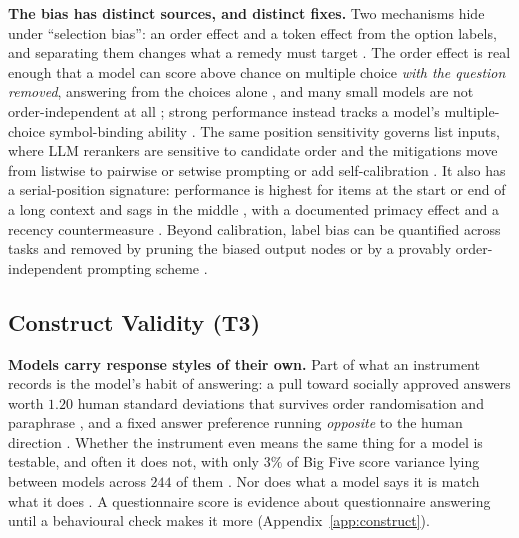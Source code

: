 \documentclass[11pt]{article}
\begin{document}
\textbf{The bias has distinct sources, and distinct fixes.} Two mechanisms hide
under ``selection bias'': an order effect and a token effect from the option
labels, and separating them changes what a remedy must target
\cite{wei2024unveiling}. The order effect is real enough that a model can score
above chance on multiple choice \emph{with the question removed}, answering from
the choices alone \cite{balepur2024artifacts}, and many small models are not
order-independent at all \cite{khatun2024mcqa}; strong performance instead tracks
a model's multiple-choice symbol-binding ability \cite{robinson2023mcsb}. The
same position sensitivity governs list inputs, where LLM rerankers are sensitive
to candidate order and the mitigations move from listwise to pairwise or setwise
prompting or add self-calibration
\cite{sun2023rankgpt,qin2024pairwise,zhuang2024setwise,ren2024selfcalibrated}. It
also has a serial-position signature: performance is highest for items at the
start or end of a long context and sags in the middle
\cite{liu2024lostmiddle}, with a documented primacy effect
\cite{wang2023primacy} and a recency countermeasure \cite{peysakhovich2023attention}.
Beyond calibration, label bias can be quantified across tasks
\cite{reif2024labelbias} and removed by pruning the biased output nodes
\cite{choi2025nodepruning} or by a provably order-independent prompting scheme
\cite{mcilroyyoung2024setbased}.

\subsection{Construct Validity (T3)}

\label{app:tierevidence3}

\textbf{Models carry response styles of their own.} Part of what an instrument
records is the model's habit of answering: a pull toward socially approved
answers worth $1.20$ human standard deviations that survives order
randomisation and paraphrase \cite{salecha2024social}, and a fixed answer
preference running \emph{opposite} to the human direction
\cite{braun2025acquiescence}. Whether the instrument even means the same thing
for a model is testable, and often it does not, with only $3\%$ of Big Five
score variance lying between models across $244$ of them
\cite{zierahn2026without,zeinfeld2026dif}. Nor does what a model says it is
match what it does \cite{han2025illusion,contreras2026native}. A questionnaire
score is evidence about questionnaire answering until a behavioural check makes
it more (Appendix~\ref{app:construct}).
\end{document}
